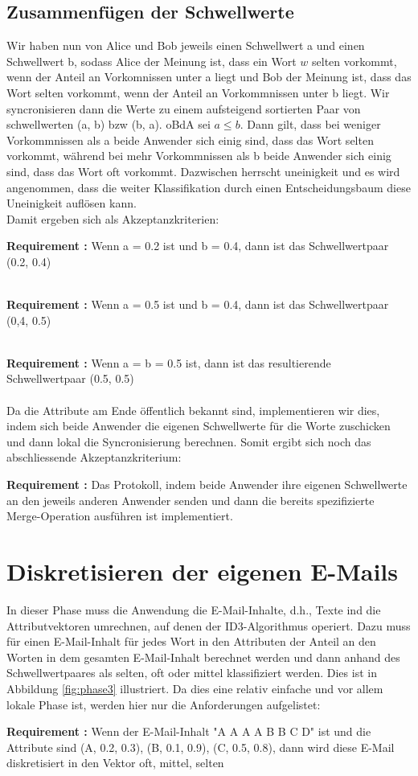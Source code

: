 \documentclass{article}
\newcounter{requirementscount}{}
\newcommand{\requirement}[1] {
        \addtocounter{requirementscount}{1}
        {\bf Requirement \therequirementscount:} #1\\
    }
\begin{document}
\subsection{Zusammenf\"ugen der Schwellwerte}
Wir haben nun von Alice und Bob jeweils einen Schwellwert a und einen
Schwellwert b, sodass Alice der Meinung ist, dass ein Wort \(w\)
selten vorkommt, wenn der Anteil an Vorkomnissen unter a liegt und
Bob der Meinung ist, dass das Wort selten vorkommt, wenn der Anteil an
Vorkommnissen unter b liegt. Wir syncronisieren dann die Werte zu einem
aufsteigend sortierten Paar von schwellwerten (a, b) bzw (b, a). oBdA sei
\(a \leq b\). Dann gilt, dass bei weniger Vorkommnissen als a beide Anwender
sich einig sind, dass das Wort selten vorkommt, w\"ahrend bei mehr Vorkommnissen
als b beide Anwender sich einig sind, dass das Wort oft vorkommt. Dazwischen 
herrscht uneinigkeit und es wird angenommen, dass die weiter Klassifikation
durch einen Entscheidungsbaum diese Uneinigkeit aufl\"osen kann.\\
Damit ergeben sich als Akzeptanzkriterien:\\
\requirement{Wenn a = 0.2 ist und b = 0.4, dann ist das Schwellwertpaar
(0.2, 0.4)}\\
\requirement{Wenn a = 0.5 ist und b = 0.4, dann ist das Schwellwertpaar
(0,4, 0.5)}\\
\requirement{Wenn a = b = 0.5 ist, dann ist das resultierende Schwellwertpaar
(0.5, 0.5)}\\
Da die Attribute am Ende \"offentlich bekannt sind, implementieren wir
dies, indem sich beide Anwender die eigenen Schwellwerte f\"ur die Worte
zuschicken und dann lokal die Syncronisierung berechnen. Somit ergibt
sich noch das abschliessende Akzeptanzkriterium:\\
\requirement{Das Protokoll, indem beide Anwender ihre eigenen Schwellwerte
an den jeweils anderen Anwender senden und dann die bereits spezifizierte
Merge-Operation ausf\"uhren ist implementiert.}

\pagebreak %
\section{Diskretisieren der eigenen E-Mails}
In dieser Phase muss die Anwendung die E-Mail-Inhalte, d.h., Texte ind
die Attributvektoren umrechnen, auf denen der ID3-Algorithmus operiert.
Dazu muss f\"ur einen E-Mail-Inhalt f\"ur jedes Wort in den Attributen
der Anteil an den Worten in dem gesamten E-Mail-Inhalt berechnet werden
und dann anhand des Schwellwertpaares als selten, oft oder mittel
klassifiziert werden. Dies ist in Abbildung \ref{fig:phase3} illustriert.
Da dies eine relativ einfache und vor allem lokale Phase ist, werden
hier nur die Anforderungen aufgelistet:\\
\requirement{Wenn der E-Mail-Inhalt "A A A A B B C D" ist und die Attribute
sind (A, 0.2, 0.3), (B, 0.1, 0.9), (C, 0.5, 0.8),
dann wird diese E-Mail diskretisiert in den Vektor oft, mittel, selten}
\end{document}
